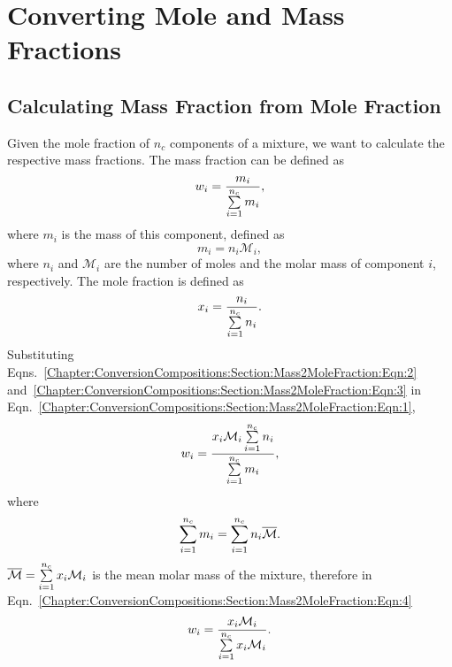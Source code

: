 
\chapter{Converting Mole and Mass Fractions}\label{Chapter:ConversionCompositions}

\section{Calculating Mass Fraction from Mole Fraction}\label{Chapter:ConversionCompositions:Section:Mass2MoleFraction}
Given the mole fraction of $n_{c}$ components of a mixture, we want to calculate the respective mass fractions. The mass fraction can be defined as
   \begin{equation}
       w_{i} = \displaystyle\frac{m_{i}}{\sum\limits_{i=1}^{n_{c}}m_{i}},\label{Chapter:ConversionCompositions:Section:Mass2MoleFraction:Eqn:1}
   \end{equation}
where $m_{i}$ is the mass of this component, defined as
   \begin{equation}
      m_{i} = n_{i}\mathcal{M}_{i},\label{Chapter:ConversionCompositions:Section:Mass2MoleFraction:Eqn:2}
   \end{equation}
where $n_{i}$ and $\mathcal{M}_{i}$ are the number of moles and the molar mass of component $i$, respectively. The mole fraction is defined as 
   \begin{equation}
     x_{i} = \displaystyle\frac{n_{i}}{\sum\limits_{i=1}^{n_{c}} n_{i}}.\label{Chapter:ConversionCompositions:Section:Mass2MoleFraction:Eqn:3}
   \end{equation}
Substituting Eqns.~\ref{Chapter:ConversionCompositions:Section:Mass2MoleFraction:Eqn:2} and~\ref{Chapter:ConversionCompositions:Section:Mass2MoleFraction:Eqn:3} in Eqn.~\ref{Chapter:ConversionCompositions:Section:Mass2MoleFraction:Eqn:1},
   \begin{equation}
     w_{i} = \displaystyle\frac{x_{i}\mathcal{M}_{i}\sum\limits_{i=1}^{n_{c}}n_{i}}{\sum\limits_{i=1}^{n_{c}}m_{i}},\label{Chapter:ConversionCompositions:Section:Mass2MoleFraction:Eqn:4}
   \end{equation}
where 
   \begin{equation}
     \sum\limits_{i=1}^{n_{c}}m_{i} = \sum\limits_{i=1}^{n_{c}}n_{i}\overline{\mathcal{M}}.
   \end{equation}
$\overline{\mathcal{M}} = \sum\limits_{i=1}^{n_{c}} x_{i}\mathcal{M}_{i}$ is the mean molar mass of the mixture, therefore in Eqn.~\ref{Chapter:ConversionCompositions:Section:Mass2MoleFraction:Eqn:4}
   \begin{equation}
     w_{i} = \displaystyle\frac{x_{i}\mathcal{M}_{i}}{\sum\limits_{i=1}^{n_{c}}x_{i}\mathcal{M}_{i}}.\label{Chapter:ConversionCompositions:Section:Mass2MoleFraction:Eqn:5}
   \end{equation}


